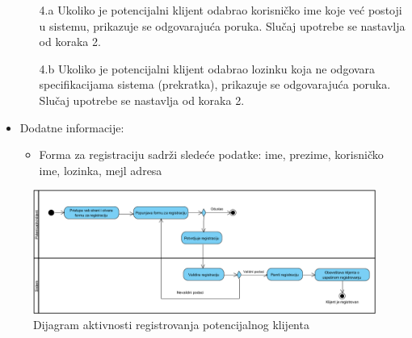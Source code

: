 \begin{itemize}
\begin{itemize}
            \item[4.a] Ukoliko je potencijalni klijent odabrao korisničko ime koje već postoji u sistemu, prikazuje se odgovarajuća poruka. Slučaj upotrebe se nastavlja od koraka 2.
            \item[4.b] Ukoliko je potencijalni klijent odabrao lozinku koja ne odgovara specifikacijama sistema (prekratka), prikazuje se odgovarajuća poruka. Slučaj upotrebe se nastavlja od koraka 2.
        \end{itemize}
    \item Dodatne informacije:
    \begin{itemize}
        \item Forma za registraciju sadrži sledeće podatke: ime, prezime, korisničko ime, lozinka, mejl adresa
    \end{itemize}
\end{itemize}

\begin{figure}[H]
\begin{center}
\includegraphics[width=\textwidth]{Pictures/activity_client_registration.png}
\end{center}
    \caption{Dijagram aktivnosti registrovanja potencijalnog klijenta}
\label{fig:ActivityClientRegistration}
\end{figure}
